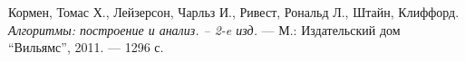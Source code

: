 \begin{thebibliography}{99}
    Кормен, Томас Х., Лейзерсон, Чарльз И., Ривест, Рональд Л., Штайн, Клиффорд.
    {\itshape Алгоритмы: построение и анализ. -- 2-e изд.} --- М.: Издательский дом \enquote{Вильямс}, 2011. --- 1296 с.
    \end{thebibliography}
    \pagebreak
